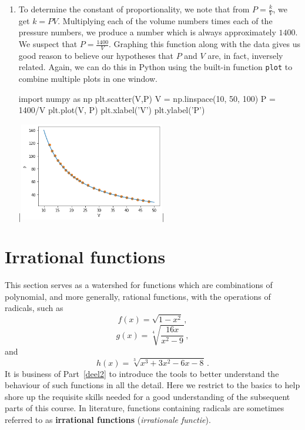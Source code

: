 \begin{example}
\begin{enumerate}
\item  To determine the constant of proportionality, we note that from $P = \frac{k}{V}$, we get $k = PV$.  Multiplying each of the volume numbers times each of the pressure numbers, we produce a number which is always approximately $1400$.  We suspect that $P = \frac{1400}{V}$.  Graphing this function  along with the data gives us good reason to believe our hypotheses that $P$ and $V$ are, in fact, inversely related. Again, we can do this in Python using the built-in function \lstinline{plot} to combine multiple plots in one window.
\begin{pyin}
import numpy as np
plt.scatter(V,P)
V = np.linspace(10, 50, 100)
P = 1400/V
plt.plot(V, P)
plt.xlabel('V')
plt.ylabel('P')
\end{pyin}
\begin{pyout}
|\includegraphics[width=0.5\textwidth]{fig_algebraic_13_Python}|
\end{pyout}
\fi

\end{enumerate}

\end{example}
\fi

\fi

\section{Irrational functions}
\label{irrat_functies}
This section serves as a watershed for functions which are combinations of polynomial, and more generally, rational functions, with the operations of radicals, such as
$$f(x) = \sqrt{1 - x^{2}}\,,$$
$$g(x) = \sqrt[4]{\dfrac{16x}{x^{2} - 9}}\,,$$
and
$$h(x) = \sqrt[3]{x^{3} + 3x^{2} - 6x - 8}\,.$$
\ifcourse
It is business of Part~\ref{deel2} to introduce the tools to better understand the behaviour of such functions in all the detail. Here we restrict to the basics to help shore up the requisite skills needed for a good understanding of the subsequent parts of this course. \fi In literature, functions containing radicals are sometimes referred to as \textbf{irrational functions} (\textit{irrationale functie}). 

